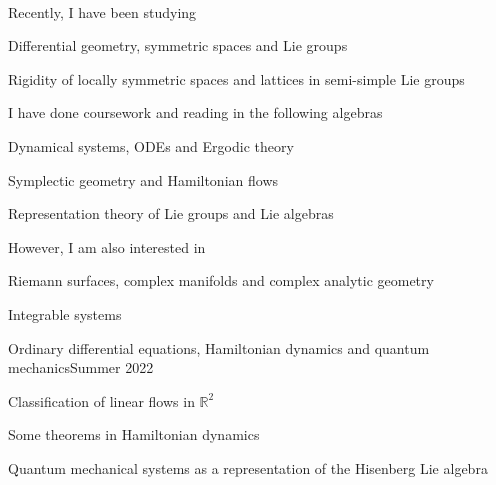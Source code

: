 \documentclass{LoLaTeXcv}
\begin{document}

\

Recently, I have been studying

\begin{lltxItemize}
	\item Differential geometry, symmetric spaces and Lie groups
	\item Rigidity of locally symmetric spaces and lattices in semi-simple Lie groups
\end{lltxItemize}

I have done coursework and reading in the following algebras


\begin{lltxItemize}
	\item Dynamical systems, ODEs and Ergodic theory
	\item Symplectic geometry and Hamiltonian flows
	\item Representation theory of Lie groups and Lie algebras
\end{lltxItemize}

However, I am also interested in 

\begin{lltxItemize}
	\item Riemann surfaces, complex manifolds and complex analytic geometry
	\item Integrable systems
\end{lltxItemize}



\begin{lltxJob}{Ordinary differential equations, Hamiltonian dynamics and quantum mechanics}{Summer 2022}{}
	\item Classification of linear flows in $\mathbb{R}^2$
	\item Some theorems in Hamiltonian dynamics
	\item Quantum mechanical systems as a representation of the Hisenberg Lie algebra
\end{lltxJob}
\end{document}

